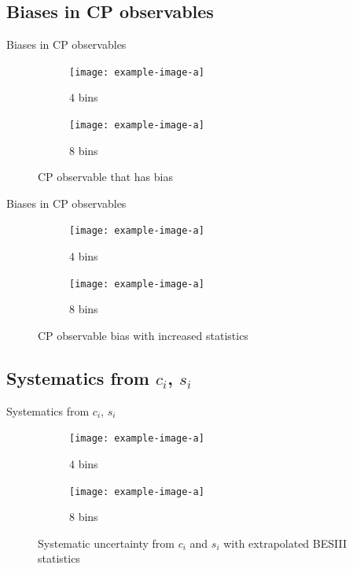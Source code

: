 \documentclass{beamer}
\begin{document}
\subsection{Biases in CP observables}
\begin{frame}{Biases in CP observables}
  \begin{figure}
    \centering
    \vspace{-0.2cm}
    \begin{subfigure}{0.5\textwidth}
      \texttt{[image: example-image-a]}
      \caption{$4$ bins}
    \end{subfigure}%
    \begin{subfigure}{0.5\textwidth}
      \texttt{[image: example-image-a]}
      \caption{$8$ bins}
    \end{subfigure}
    \caption{CP observable that has bias}
  \end{figure}
\end{frame}

\begin{frame}{Biases in CP observables}
  \begin{figure}
    \centering
    \vspace{-0.2cm}
    \begin{subfigure}{0.5\textwidth}
      \texttt{[image: example-image-a]}
      \caption{$4$ bins}
    \end{subfigure}%
    \begin{subfigure}{0.5\textwidth}
      \texttt{[image: example-image-a]}
      \caption{$8$ bins}
    \end{subfigure}
    \caption{CP observable bias with increased statistics}
  \end{figure}
\end{frame}

\subsection{Systematics from \texorpdfstring{$c_i$, $s_i$}{ci, si}}
\begin{frame}{Systematics from $c_i$, $s_i$}
  \begin{figure}
    \centering
    \vspace{-0.2cm}
    \begin{subfigure}{0.5\textwidth}
      \texttt{[image: example-image-a]}
      \caption{$4$ bins}
    \end{subfigure}%
    \begin{subfigure}{0.5\textwidth}
      \texttt{[image: example-image-a]}
      \caption{$8$ bins}
    \end{subfigure}
    \caption{Systematic uncertainty from $c_i$ and $s_i$ with extrapolated BESIII statistics}
  \end{figure}
\end{frame}
\end{document}
